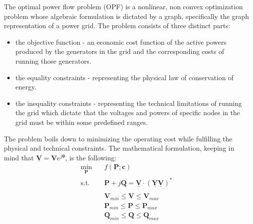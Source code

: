 The optimal power flow problem (OPF) is a nonlinear, non convex optimization problem\cite{cain2012history, bienstock2019strong} whose algebraic formulation is dictated by a graph,
specifically the graph representation of a power grid.
The problem consists of three distinct parts:

\begin{itemize}
    \item the objective function - an economic cost function of the active powers produced by the generators in
    the grid and the corresponding costs of running those generators.

    \item the equality constraints - representing the physical law of conservation of energy.

    \item the inequality constraints - representing the technical limitations of running the grid which dictate that
    the voltages and powers of specific nodes in the grid must be within some predefined ranges.
\end{itemize}

\noindent The problem boils down to minimizing the operating cost while fulfilling the physical and technical constraints.
The mathematical formulation, keeping in mind that $\boldsymbol{\underline{V}} = \boldsymbol{V}e^{j\boldsymbol{\theta}}$, is the following:
\begin{equation}
    \begin{aligned}
        \min_{\boldsymbol{P}} \quad & f(\boldsymbol{P}; \boldsymbol{c})\\%
        \textrm{s.t.} %
        \quad & \boldsymbol{P} + j\boldsymbol{Q} = \underline{\boldsymbol{V}} \cdot \left(\underline{\boldsymbol{Y}}\underline{\boldsymbol{V}}\right)^*\\ \\
        \quad & \boldsymbol{V}_{min} \leq \boldsymbol{V} \leq \boldsymbol{V}_{max} \\
        \quad & \boldsymbol{P}_{min} \leq \boldsymbol{P} \leq \boldsymbol{P}_{max} \\
        \quad & \boldsymbol{Q}_{min} \leq \boldsymbol{Q} \leq \boldsymbol{Q}_{max}
    \end{aligned}
\end{equation}

